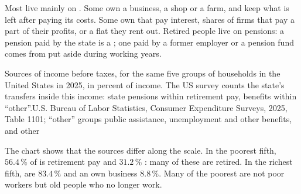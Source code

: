 Most  live mainly on . Some own a business, a shop or a farm, and keep what is
left after paying its costs. Some own  that pay interest, shares of firms that pay a part
of their profits, or a flat they rent out. Retired people live on pensions: a pension paid by
the state is a ; one paid by a former employer or a pension fund comes from  put
aside during working years.

\begin{omchart}{Sources of income before taxes, for the same five groups of households in the
United States in 2025, in percent of income. The US survey counts the state's transfers inside
this income: state pensions within retirement pay, benefits within ``other''.}{U.S. Bureau of
Labor Statistics, Consumer Expenditure Surveys, 2025, Table 1101; ``other'' groups public
assistance, unemployment and other benefits, and other }
\end{omchart}

The chart shows that the sources differ along the  scale. In the poorest fifth, $56.4\,\%$
of  is retirement pay and $31.2\,\%$ : many of these  are retired. In the
richest fifth,  are $83.4\,\%$ and an own business $8.8\,\%$. Many of the poorest 
are not poor workers but old people who no longer work.

